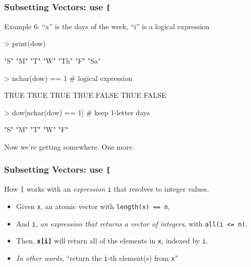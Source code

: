 \documentclass{beamer}
\newcommand{\R}[1]{\texttt{#1}}
\begin{document}
\begin{frame}[fragile]
\frametitle{Subsetting Vectors: use \R{[}}

Example 6: ``x'' is the days of the week, ``i'' is a logical expression
\pause
\begin{Schunk}
\begin{Sinput}
> print(dow)
\end{Sinput}
\begin{Soutput}
[1] "S"  "M"  "T"  "W"  "Th" "F"  "Sa"
\end{Soutput}
\end{Schunk}
\pause
\begin{Schunk}
\begin{Sinput}
> nchar(dow) == 1  # logical expression
\end{Sinput}
\begin{Soutput}
[1]  TRUE  TRUE  TRUE  TRUE FALSE  TRUE FALSE
\end{Soutput}
\end{Schunk}
\pause
\begin{Schunk}
\begin{Sinput}
> dow[nchar(dow) == 1]  # keep 1-letter days
\end{Sinput}
\end{Schunk}
\pause
\begin{Schunk}
\begin{Soutput}
[1] "S" "M" "T" "W" "F"
\end{Soutput}
\end{Schunk}
\pause
Now we're getting somewhere. One more.

\end{frame}



\begin{frame}[fragile]
\frametitle{Subsetting Vectors: use \R{[}}

How \R{[} works with an \textit{expression} \R{i} that resolves to integer values.
\begin{itemize}
\item Given \R{x}, an atomic vector with \R{length(x) == n},
\item And \R{i}, \textit{an expression that returns a vector of integers}, with \R{all(i <= n)}.
\item Then, \R{\textbf{x[i]}} will return all of the elements in \R{x}, indexed by \R{i}.
\item \textit{In other words}, ``return the \R{i}-th element(s) from \R{x}''
\end{itemize}

\end{frame}
\end{document}
